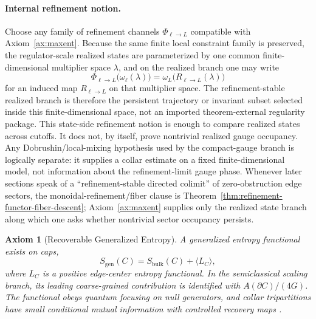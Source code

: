 \documentclass[11pt]{article}
\newtheorem{axiom}[theorem]{Axiom}
\begin{document}
\paragraph{Internal refinement notion.}
Choose any family of refinement channels \(\Phi_{\ell\to L}\) compatible with Axiom~\ref{ax:maxent}. Because the same finite local constraint family is preserved, the regulator-scale realized states are parameterized by one common finite-dimensional multiplier space \(\lambda\), and on the realized branch one may write
\[
\Phi_{\ell\to L}\bigl(\omega_{\ell}(\lambda)\bigr)
=
\omega_{L}\!\bigl(R_{\ell\to L}(\lambda)\bigr)
\]
for an induced map \(R_{\ell\to L}\) on that multiplier space. The refinement-stable realized branch is therefore the persistent trajectory or invariant subset selected inside this finite-dimensional space, not an imported theorem-external regularity package. This state-side refinement notion is enough to compare realized states across cutoffs. It does not, by itself, prove nontrivial realized gauge occupancy. Any Dobrushin/local-mixing hypothesis used by the compact-gauge branch is logically separate: it supplies a collar estimate on a fixed finite-dimensional model, not information about the refinement-limit gauge phase. Whenever later sections speak of a ``refinement-stable directed colimit'' of zero-obstruction edge sectors, the monoidal-refinement/fiber clause is Theorem~\ref{thm:refinement-functor-fiber-descent}; Axiom~\ref{ax:maxent} supplies only the realized state branch along which one asks whether nontrivial sector occupancy persists.

\begin{axiom}[Recoverable Generalized Entropy]\label{ax:entropy}
A generalized entropy functional exists on caps,
\[
S_{\mathrm{gen}}(C)=S_{\mathrm{bulk}}(C)+\langle L_C\rangle,
\]
where \(L_C\) is a positive edge-center entropy functional. In the semiclassical scaling branch, its leading coarse-grained contribution is identified with \(A(\partial C)/(4G)\). The functional obeys quantum focusing on null generators, and collar tripartitions have small conditional mutual information with controlled recovery maps \cite{liebRuskai73,petz86,petz88,fawziRenner15}.
\end{axiom}
\end{document}
